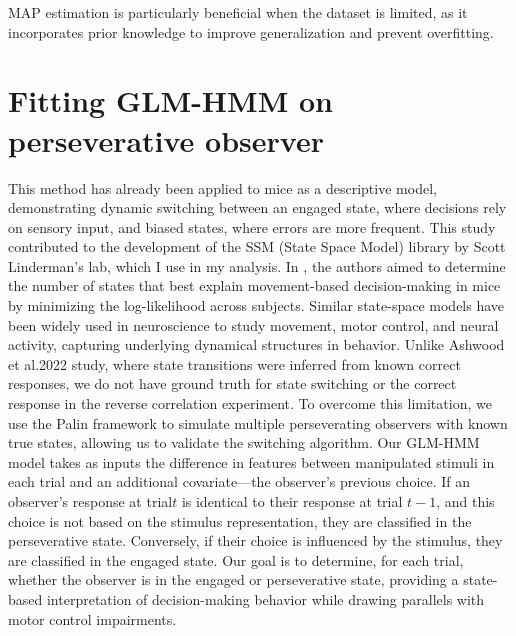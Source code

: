 MAP estimation is particularly beneficial when the dataset is limited, as it incorporates prior knowledge to improve generalization and prevent overfitting.

\section {Fitting GLM-HMM on perseverative observer} 
This method has already been applied to mice as a descriptive model, demonstrating dynamic switching between an engaged state, where decisions rely on sensory input, and biased states, where errors are more frequent. This study contributed to the development of the SSM (State Space Model) library by Scott Linderman's lab, which I use in my analysis. In \cite{ashwood_mice_2022}, the authors aimed to determine the number of states that best explain movement-based decision-making in mice by minimizing the log-likelihood across subjects. Similar state-space models have been widely used in neuroscience to study movement, motor control, and neural activity, capturing underlying dynamical structures in behavior. Unlike Ashwood et al.2022 study, where state transitions were inferred from known correct responses, we do not have ground truth for state switching or the correct response in the reverse correlation experiment. To overcome this limitation, we use the Palin framework to simulate multiple perseverating observers with known true states, allowing us to validate the switching algorithm.
Our GLM-HMM model takes as inputs the difference in features between manipulated stimuli in each trial and an additional covariate—the observer's previous choice. If an observer’s response at trial\( t \) is identical to their response at trial \( t-1 \), and this choice is not based on the stimulus representation, they are classified in the perseverative state. Conversely, if their choice is influenced by the stimulus, they are classified in the engaged state. Our goal is to determine, for each trial, whether the observer is in the engaged or perseverative state, providing a state-based interpretation of decision-making behavior while drawing parallels with motor control impairments.
